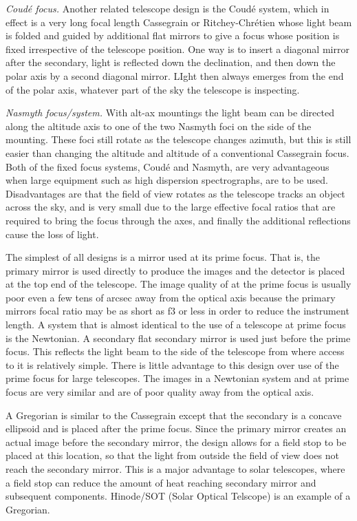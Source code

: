\documentclass{article}
\begin{document}
{\it Coud\'e focus.} Another related telescope design is the Coud{\'e} system, which in effect
is a very long focal length Cassegrain or Ritchey-Chr{\'e}tien whose light 
beam is folded and guided by additional flat mirrors to give a focus whose
position is fixed irrespective of the telescope position. One way is to insert a 
diagonal mirror after the secondary, light is reflected down the declination, and 
then down the polar axis by a second diagonal mirror. LIght then always emerges
from the end of the polar axis, whatever part of the sky the telescope is inspecting.

\noindent
{\it Nasmyth focus/system.} With alt-ax mountings the light beam can be directed
along the altitude axis to one of the two Nasmyth foci on the side of the mounting.
These foci still rotate as the telescope changes azimuth, but this is still easier than 
changing the altitude and altitude of a conventional Cassegrain focus. Both of the
fixed focus systems, Coud\'e and Nasmyth, are very advantageous when large equipment
such as high dispersion spectrographs, are to be used. Disadvantages are that the
field of view rotates as the telescope tracks an object across the sky, and is very 
small due to the large effective focal ratios that are required to bring the focus 
through the axes, and finally the additional reflections cause the loss of light.

The simplest of all designs is a mirror used at its prime focus. That is, 
the primary mirror is used directly to produce the images and the detector
is placed at the top end of the telescope. The image quality of at the prime
focus is usually poor even a few tens of arcsec away from the optical axis
because the primary mirrors focal ratio may be as short as f3 or less in
order to reduce the instrument length. A system that is almost identical
to the use of a telescope at prime focus is the Newtonian. A secondary 
flat secondary mirror is used just before the prime focus. This reflects the
light beam to the side of the telescope from where access to it is relatively
simple. There is little advantage to this design over use of the prime focus
for large telescopes. The images in a Newtonian system and at prime focus 
are very similar and are of poor quality away from the optical axis.

A Gregorian is similar to the Cassegrain except that the secondary is a
concave ellipsoid and is placed after the prime focus. Since the primary 
mirror creates an actual image before the secondary mirror, the design
allows for a field stop to be placed at this location, so that the light from outside
the field of view does not reach the secondary mirror. This is a major advantage
to solar telescopes, where a field stop can reduce the amount of heat reaching secondary
mirror and subsequent components. Hinode/SOT (Solar Optical Telscope) is an 
example of a Gregorian.
\end{document}
